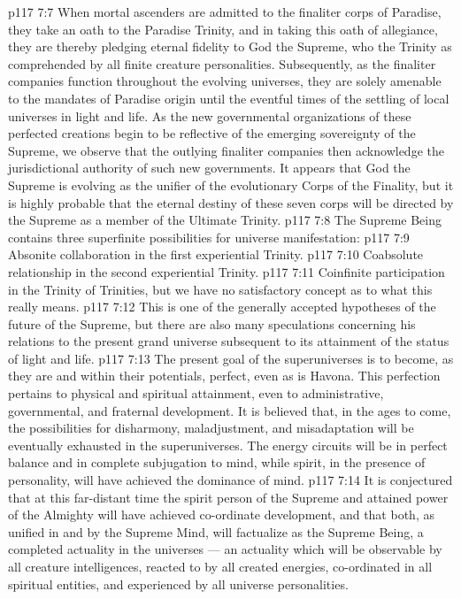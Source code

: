 \vs p117 7:7 \pc When mortal ascenders are admitted to the finaliter corps of Paradise, they take an oath to the Paradise Trinity, and in taking this oath of allegiance, they are thereby pledging eternal fidelity to God the Supreme, who  the Trinity as comprehended by all finite creature personalities. Subsequently, as the finaliter companies function throughout the evolving universes, they are solely amenable to the mandates of Paradise origin until the eventful times of the settling of local universes in light and life. As the new governmental organizations of these perfected creations begin to be reflective of the emerging sovereignty of the Supreme, we observe that the outlying finaliter companies then acknowledge the jurisdictional authority of such new governments. It appears that God the Supreme is evolving as the unifier of the evolutionary Corps of the Finality, but it is highly probable that the eternal destiny of these seven corps will be directed by the Supreme as a member of the Ultimate Trinity.
\vs p117 7:8 \pc The Supreme Being contains three superfinite possibilities for universe manifestation:
\vs p117 7:9 \bibnobreakspace Absonite collaboration in the first experiential Trinity.
\vs p117 7:10 \bibnobreakspace Coabsolute relationship in the second experiential Trinity.
\vs p117 7:11 \bibnobreakspace Coinfinite participation in the Trinity of Trinities, but we have no satisfactory concept as to what this really means.
\vs p117 7:12 \pc This is one of the generally accepted hypotheses of the future of the Supreme, but there are also many speculations concerning his relations to the present grand universe subsequent to its attainment of the status of light and life.
\vs p117 7:13 The present goal of the superuniverses is to become, as they are and within their potentials, perfect, even as is Havona. This perfection pertains to physical and spiritual attainment, even to administrative, governmental, and fraternal development. It is believed that, in the ages to come, the possibilities for disharmony, maladjustment, and misadaptation will be eventually exhausted in the superuniverses. The energy circuits will be in perfect balance and in complete subjugation to mind, while spirit, in the presence of personality, will have achieved the dominance of mind.
\vs p117 7:14 It is conjectured that at this far\hyp{}distant time the spirit person of the Supreme and attained power of the Almighty will have achieved co\hyp{}ordinate development, and that both, as unified in and by the Supreme Mind, will factualize as the Supreme Being, a completed actuality in the universes --- an actuality which will be observable by all creature intelligences, reacted to by all created energies, co\hyp{}ordinated in all spiritual entities, and experienced by all universe personalities.
